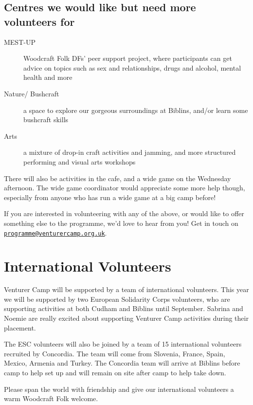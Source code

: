\documentclass[a4paper, 11pt]{report}
\newcommand{\nl}{\newline}
\begin{document}
\section{Centres we would like but need more volunteers for}
\begin{description}
    \item[MEST-UP] Woodcraft Folk DFs' peer support project, where participants can get advice on topics such as sex and relationships, drugs and alcohol, mental health and more
    \item[Nature/ Bushcraft] a space to explore our gorgeous surroundings at Biblins, and/or learn some bushcraft skills
    \item[Arts]  a mixture of drop-in craft activities and jamming, and more structured performing and visual arts workshops 
\end{description}

There will also be activities in the cafe, and a wide game on the Wednesday afternoon. The wide game coordinator would appreciate some more help though, especially from anyone who has run a wide game at a big camp before! 

If you are interested in volunteering with any of the above, or would like to offer something else to the programme, we'd love to hear from you! Get in touch on 
\href{mailto:programme@venturercamp.org.uk}{\texttt{programme@venturercamp.org.uk}}.

\chapter{International Volunteers}
Venturer Camp will be supported by a team of international volunteers. This year we will be supported by two European Solidarity Corps volunteers, who are supporting activities at both Cudham and Biblins until September. Sabrina and Noemie are really excited about supporting Venturer Camp activities during their placement.\nl

The ESC volunteers will also be joined by a team of 15 international volunteers recruited by Concordia. The team will come from Slovenia, France, Spain, Mexico, Armenia and Turkey. The Concordia team will arrive at Biblins before camp to help set up and will remain on site after camp to help take down.\nl

Please span the world with friendship and give our international volunteers a warm Woodcraft Folk welcome.
\end{document}

